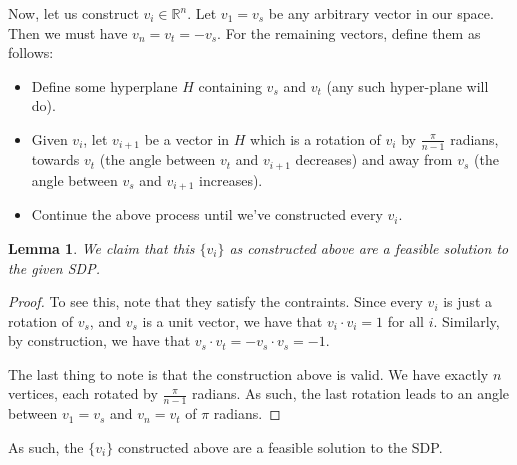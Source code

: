 \documentclass[12pt]{exam}
\newtheorem{lemma}[theorem]{Lemma}
\begin{document}
\begin{questions}
\begin{solution}
\begin{enumerate}[label=(\alph*)]
    Now, let us construct $v_i \in \mathbb{R}^n$. Let $v_1 = v_s$ be any arbitrary vector in our space. Then we must have $v_n = v_t = -v_s$. For the remaining vectors, define them as follows:
    \begin{itemize}
      \item Define some hyperplane $H$ containing $v_s$ and $v_t$ (any such hyper-plane will do).
      \item Given $v_i$, let $v_{i+1}$ be a vector in $H$ which is a rotation of $v_i$ by $\frac{\pi}{n-1}$ radians, towards $v_t$ (the angle between $v_t$ and $v_{i+1}$ decreases) and away from $v_s$ (the angle between $v_s$ and $v_{i+1}$ increases). 
      \item Continue the above process until we've constructed every $v_i$.
    \end{itemize}

    \begin{lemma}
      We claim that this $\{ v_i \}$ as constructed above are a feasible solution to the given SDP.
    \end{lemma}
    \begin{proof}
      To see this, note that they satisfy the contraints. Since every $v_i$ is just a rotation of $v_s$, and $v_s$ is a unit vector, we have that $v_i \cdot v_i = 1$ for all $i$. Similarly, by construction, we have that $v_s \cdot v_t = -v_s \cdot v_s = -1$.

      The last thing to note is that the construction above is valid. We have exactly $n$ vertices, each rotated by $\frac{\pi}{n-1}$ radians. As such, the last rotation leads to an angle between $v_1 = v_s$ and $v_n = v_t$ of $\pi$ radians.
    \end{proof}

    As such, the $\{v_i\}$ constructed above are a feasible solution to the SDP.


\end{enumerate}
\end{solution}
\end{questions}
\end{document}
